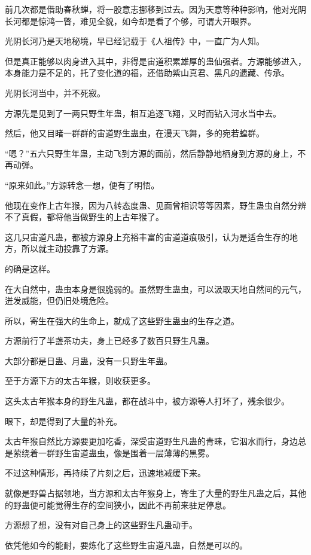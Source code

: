 \begin{this_body}
前几次都是借助春秋蝉，将一股意志挪移到过去。因为天意等种种影响，他对光阴长河都是惊鸿一瞥，难见全貌，如今却是看了个够，可谓大开眼界。

光阴长河乃是天地秘境，早已经记载于《人祖传》中，一直广为人知。

但是真正能够以肉身进入其中，非得是宙道积累雄厚的蛊仙强者。方源能够进入，本身能力是不足的，托了变化道的福，还借助紫山真君、黑凡的遗藏、传承。

光阴长河当中，并不死寂。

方源先是见到了一两只野生年蛊，相互追逐飞翔，又时而钻入河水当中去。

然后，他又目睹一群群的宙道野生蛊虫，在漫天飞舞，多的宛若蝗群。

“嗯？”五六只野生年蛊，主动飞到方源的面前，然后静静地栖身到方源的身上，不再动弹。

“原来如此。”方源转念一想，便有了明悟。

他现在变作上古年猴，因为八转态度蛊、见面曾相识等等因素，野生蛊虫自然分辨不了真假，都将他当做野生的上古年猴了。

这几只宙道凡蛊，都被方源身上充裕丰富的宙道道痕吸引，认为是适合生存的地方，所以就主动投靠了方源。

的确是这样。

在大自然中，蛊虫本身是很脆弱的。虽然野生蛊虫，可以汲取天地自然间的元气，迸发威能，但仍旧处境危险。

所以，寄生在强大的生命上，就成了这些野生蛊虫的生存之道。

方源前行了半盏茶功夫，身上已经多了数百只野生凡蛊。

大部分都是日蛊、月蛊，没有一只野生年蛊。

至于方源下方的太古年猴，则收获更多。

这头太古年猴本身的野生凡蛊，都在战斗中，被方源等人打坏了，残余很少。

眼下，却是得到了大量的补充。

太古年猴自然比方源要更加吃香，深受宙道野生凡蛊的青睐，它泅水而行，身边总是萦绕着一群野生宙道蛊虫，像是围着一层薄薄的黑雾。

不过这种情形，再持续了片刻之后，迅速地减缓下来。

就像是野兽占据领地，当方源和太古年猴身上，寄生了大量的野生凡蛊之后，其他的野蛊便可能觉得生存的空间狭小，因此不再前来驻足停息。

方源想了想，没有对自己身上的这些野生凡蛊动手。

依凭他如今的能耐，要炼化了这些野生宙道凡蛊，自然是可以的。


\end{this_body}
